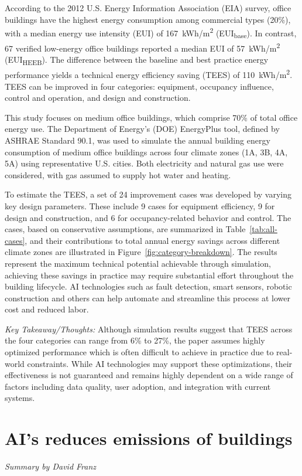 \documentclass[conference,a4paper]{IEEEtran}
\begin{document}
According to the 2012 U.S. Energy Information Association (EIA) survey, office buildings have the highest energy consumption among commercial types (20\%), with a median energy use intensity (EUI) of 167~kWh/m\textsuperscript{2} (EUI\textsubscript{base}). In contrast, 67 verified low-energy office buildings reported a median EUI of 57~kWh/m\textsuperscript{2} (EUI\textsubscript{HEEB}). The difference between the baseline and best practice energy performance yields a technical energy efficiency saving (TEES) of 110~kWh/m\textsuperscript{2}. TEES can be improved in four categories: equipment, occupancy influence, control and operation, and design and construction.

This study focuses on medium office buildings, which comprise 70\% of total office energy use. The Department of Energy's (DOE) EnergyPlus tool, defined by ASHRAE Standard 90.1, was used to simulate the annual building energy consumption of medium office buildings across four climate zones (1A, 3B, 4A, 5A) using representative U.S. cities. Both electricity and natural gas use were considered, with gas assumed to supply hot water and heating. 

To estimate the TEES, a set of 24 improvement cases was developed by varying key design parameters. These include 9 cases for equipment efficiency, 9 for design and construction, and 6 for occupancy-related behavior and control. The cases, based on conservative assumptions, are summarized in Table~\ref{tab:all-cases}, and their contributions to total annual energy savings across different climate zones are illustrated in Figure~\ref{fig:category-breakdown}. The results represent the maximum technical potential achievable through simulation, achieving these savings in practice may require substantial effort throughout the building lifecycle. AI technologies such as fault detection, smart sensors, robotic construction and others can help automate and streamline this process at lower cost and reduced labor.

\textit{Key Takeaway/Thoughts:} Although simulation results suggest that TEES across the four categories can range from 6\% to 27\%, the paper assumes highly optimized performance which is often difficult to achieve in practice due to real-world constraints. While AI technologies may support these optimizations, their effectiveness is not guaranteed and remains highly dependent on a wide range of factors including data quality, user adoption, and integration with current systems.

\section*{AI's reduces emissions of buildings}
\textit{Summary by David Franz}
\end{document}
